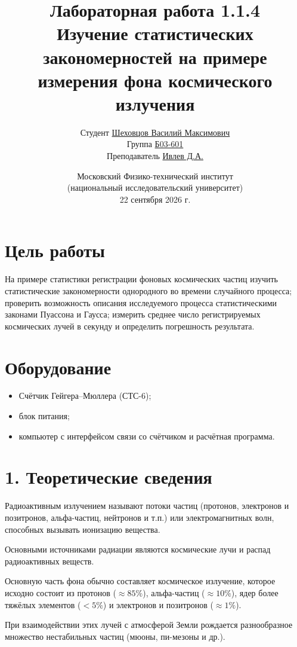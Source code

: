 \documentclass[12pt,a4paper]{article}
\title{\textbf{Лабораторная работа 1.1.4}\\
Изучение статистических закономерностей на примере измерения фона космического излучения}
\author{
    Студент \underline{Шеховцов Василий Максимович}\\
    Группа \underline{Б03-601}\\
    Преподаватель \underline{Ивлев Д.А.}
}
\date{
Московский Физико-технический институт\\
(национальный исследовательский университет)\\
22 сентября 2026 г.
}
\begin{document}

\maketitle

\section*{Цель работы}

На примере статистики регистрации фоновых космических частиц изучить статистические закономерности однородного
во времени случайного процесса; проверить возможность описания исследуемого процесса статистическими законами Пуассона и Гаусса;
измерить среднее число регистрируемых космических лучей в секунду и определить погрешность результата.

\section*{Оборудование}

\begin{itemize}
    \item Счётчик Гейгера--Мюллера (СТС-6);
    \item блок питания;
    \item компьютер с интерфейсом связи со счётчиком и расчётная программа.
\end{itemize}

\section*{1. Теоретические сведения}

Радиоактивным излучением называют потоки частиц (протонов, электронов и позитронов,
альфа-частиц, нейтронов и т.п.) или электромагнитных волн, способных вызывать ионизацию вещества.

Основными источниками радиации являются космические лучи и распад радиоактивных веществ.

Основную часть фона обычно составляет космическое излучение, которое исходно состоит из
протонов ($\approx 85\%$), альфа-частиц ($\approx 10\%$),
ядер более тяжёлых элементов ($<5\%$) и электронов и позитронов ($\approx 1\%$).

При взаимодействии этих лучей с атмосферой Земли рождается разнообразное множество нестабильных частиц
(мюоны, пи-мезоны и др.).
\end{document}
